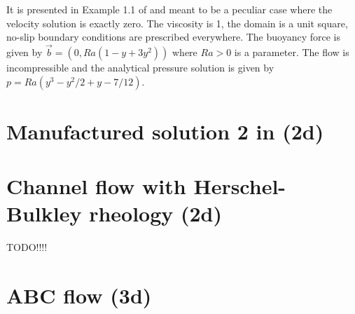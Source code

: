It is presented in Example 1.1 of \cite{jolm17} and meant to be a peculiar 
case where the velocity solution is exactly zero. The viscosity is 1, 
the domain is a unit square, no-slip boundary conditions 
are prescribed everywhere. The buoyancy force is given by 
$\vec{b}=(0,Ra(1-y+3y^2))$ where 
$Ra>0$ is a parameter. The flow is incompressible and the analytical 
pressure solution is given by $p=Ra(y^3-y^2/2+y-7/12)$.

\section{Manufactured solution 2 in \textcite{jolm17} (2d) \label{ss:mms_jolm17}}


\section{Channel flow with Herschel-Bulkley rheology (2d) \label{ss:HBflow}}
 TODO!!!!

\newpage
\section{ABC flow (3d)\label{ss:ABCflow}}


